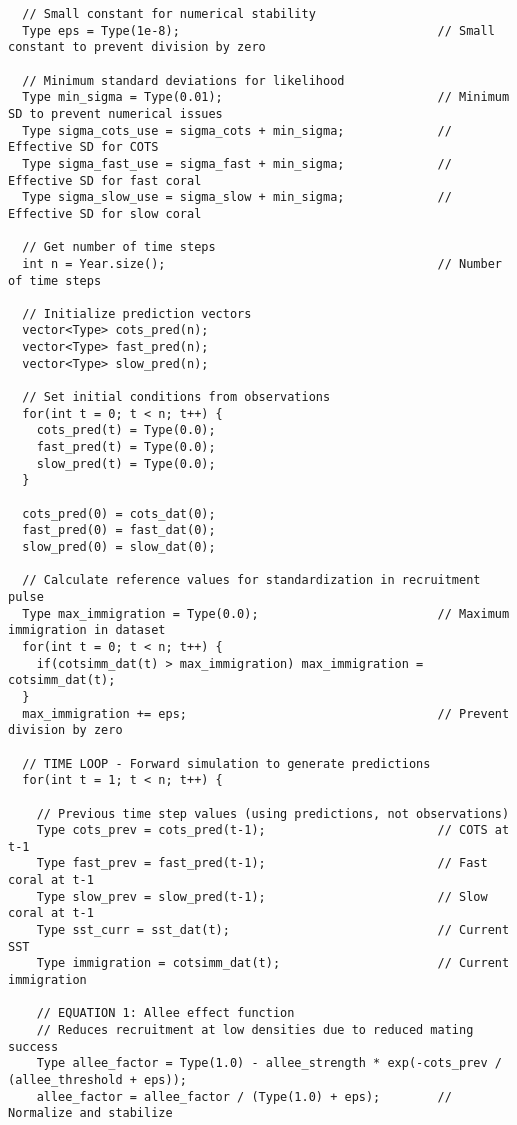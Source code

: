 \begin{lstlisting}
  // Small constant for numerical stability
  Type eps = Type(1e-8);                                    // Small constant to prevent division by zero
  
  // Minimum standard deviations for likelihood
  Type min_sigma = Type(0.01);                              // Minimum SD to prevent numerical issues
  Type sigma_cots_use = sigma_cots + min_sigma;             // Effective SD for COTS
  Type sigma_fast_use = sigma_fast + min_sigma;             // Effective SD for fast coral
  Type sigma_slow_use = sigma_slow + min_sigma;             // Effective SD for slow coral
  
  // Get number of time steps
  int n = Year.size();                                      // Number of time steps
  
  // Initialize prediction vectors
  vector<Type> cots_pred(n);
  vector<Type> fast_pred(n);
  vector<Type> slow_pred(n);
  
  // Set initial conditions from observations
  for(int t = 0; t < n; t++) {
    cots_pred(t) = Type(0.0);
    fast_pred(t) = Type(0.0);
    slow_pred(t) = Type(0.0);
  }
  
  cots_pred(0) = cots_dat(0);
  fast_pred(0) = fast_dat(0);
  slow_pred(0) = slow_dat(0);
  
  // Calculate reference values for standardization in recruitment pulse
  Type max_immigration = Type(0.0);                         // Maximum immigration in dataset
  for(int t = 0; t < n; t++) {
    if(cotsimm_dat(t) > max_immigration) max_immigration = cotsimm_dat(t);
  }
  max_immigration += eps;                                   // Prevent division by zero
  
  // TIME LOOP - Forward simulation to generate predictions
  for(int t = 1; t < n; t++) {
    
    // Previous time step values (using predictions, not observations)
    Type cots_prev = cots_pred(t-1);                        // COTS at t-1
    Type fast_prev = fast_pred(t-1);                        // Fast coral at t-1
    Type slow_prev = slow_pred(t-1);                        // Slow coral at t-1
    Type sst_curr = sst_dat(t);                             // Current SST
    Type immigration = cotsimm_dat(t);                      // Current immigration
    
    // EQUATION 1: Allee effect function
    // Reduces recruitment at low densities due to reduced mating success
    Type allee_factor = Type(1.0) - allee_strength * exp(-cots_prev / (allee_threshold + eps));
    allee_factor = allee_factor / (Type(1.0) + eps);        // Normalize and stabilize
    

\end{lstlisting}
